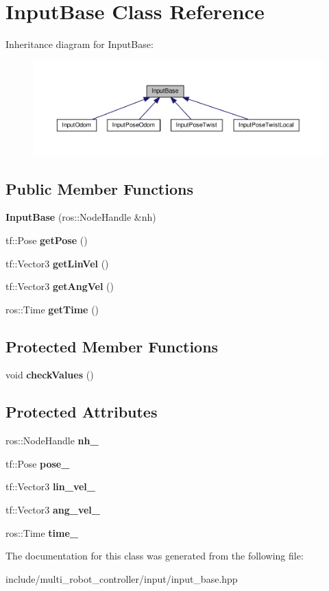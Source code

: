 \hypertarget{classInputBase}{}\section{Input\+Base Class Reference}
\label{classInputBase}


Inheritance diagram for Input\+Base\+:\nopagebreak
\begin{figure}[H]
\begin{center}
\leavevmode
\includegraphics[width=350pt]{d8/d2a/classInputBase__inherit__graph}
\end{center}
\end{figure}
\subsection*{Public Member Functions}
\begin{DoxyCompactItemize}
\item 
{\bfseries Input\+Base} (ros\+::\+Node\+Handle \&nh)
\item 
tf\+::\+Pose {\bfseries get\+Pose} ()
\item 
tf\+::\+Vector3 {\bfseries get\+Lin\+Vel} ()
\item 
tf\+::\+Vector3 {\bfseries get\+Ang\+Vel} ()
\item 
ros\+::\+Time {\bfseries get\+Time} ()
\end{DoxyCompactItemize}
\subsection*{Protected Member Functions}
\begin{DoxyCompactItemize}
\item 
void {\bfseries check\+Values} ()
\end{DoxyCompactItemize}
\subsection*{Protected Attributes}
\begin{DoxyCompactItemize}
\item 
ros\+::\+Node\+Handle {\bfseries nh\+\_\+}
\item 
tf\+::\+Pose {\bfseries pose\+\_\+}
\item 
tf\+::\+Vector3 {\bfseries lin\+\_\+vel\+\_\+}
\item 
tf\+::\+Vector3 {\bfseries ang\+\_\+vel\+\_\+}
\item 
ros\+::\+Time {\bfseries time\+\_\+}
\end{DoxyCompactItemize}


The documentation for this class was generated from the following file\+:\begin{DoxyCompactItemize}
\item 
include/multi\+\_\+robot\+\_\+controller/input/input\+\_\+base.\+hpp\end{DoxyCompactItemize}
